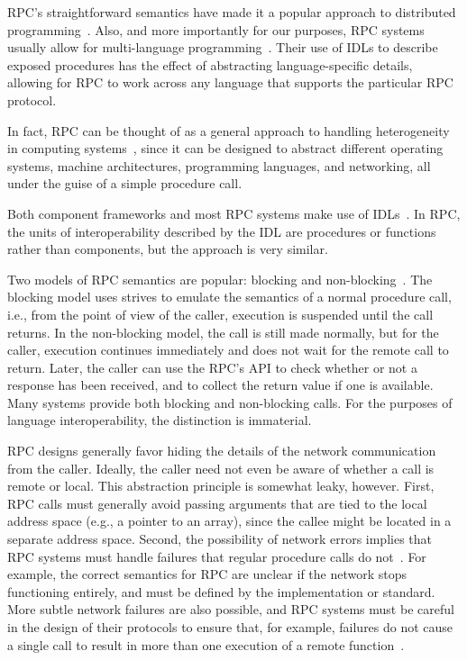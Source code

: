 RPC's straightforward semantics have made it a popular approach to distributed programming~\cite{tay90rpc}. Also, and more importantly for our purposes, RPC systems usually allow for multi-language programming~\cite{hayes87mixed}. Their use of IDLs to describe exposed procedures has the effect of abstracting language-specific details, allowing for RPC to work across any language that supports the particular RPC protocol.

In fact, RPC can be thought of as a general approach to handling heterogeneity in computing systems~\cite{notkin88interconnect}, since it can be designed to abstract different operating systems, machine architectures, programming languages, and networking, all under the guise of a simple procedure call.

Both component frameworks and most RPC systems make use of IDLs~\cite{hayes87mixed}. In RPC, the units of interoperability described by the IDL are procedures or functions rather than components, but the approach is very similar.

Two models of RPC semantics are popular: blocking and non-blocking~\cite{tay90rpc}. The blocking model uses strives to emulate the semantics of a normal procedure call, i.e., from the point of view of the caller, execution is suspended until the call returns. In the non-blocking model, the call is still made normally, but for the caller, execution continues immediately and does not wait for the remote call to return. Later, the caller can use the RPC's API to check whether or not a response has been received, and to collect the return value if one is available. Many systems provide both blocking and non-blocking calls. For the purposes of language interoperability, the distinction is immaterial.

RPC designs generally favor hiding the details of the network communication from the caller. Ideally, the caller need not even be aware of whether a call is remote or local. This abstraction principle is somewhat leaky, however. First, RPC calls must generally avoid passing arguments that are tied to the local address space (e.g., a pointer to an array), since the callee might be located in a separate address space. Second, the possibility of network errors implies that RPC systems must handle failures that regular procedure calls do not~\cite{birrell84rpc, notkin88interconnect}. For example, the correct semantics for RPC are unclear if the network stops functioning entirely, and must be defined by the implementation or standard. More subtle network failures are also possible, and RPC systems must be careful in the design of their protocols to ensure that, for example, failures do not cause a single call to result in more than one execution of a remote function~\cite{spector82remote}.

